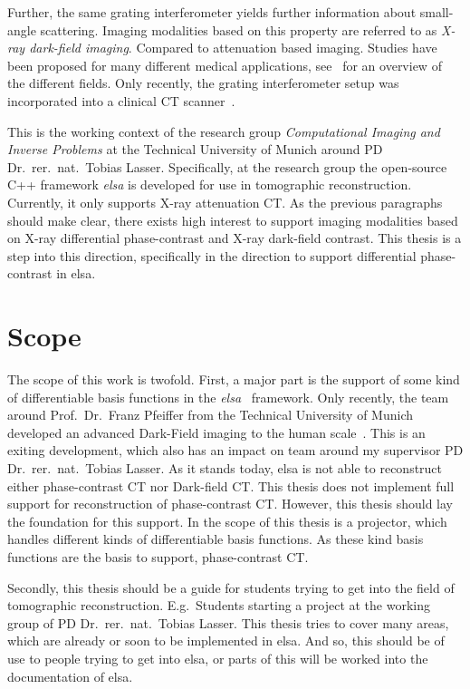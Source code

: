 Further, the same grating interferometer yields further information about small-angle scattering.
Imaging modalities based on this property are referred to as \textit{X-ray dark-field imaging}.
Compared to attenuation based imaging. Studies have been proposed for many different medical
applications, see~\cite[chap. 1.3.1]{wieczorek_anisotropic_2017} for an overview of the different
fields. Only recently, the grating interferometer setup was incorporated into a clinical CT
scanner~\cite{viermetz_dark-field_2022}.

This is the working context of the research group \textit{Computational Imaging and Inverse
	Problems} at the Technical University of Munich around PD Dr.\ rer.\ nat.\ Tobias Lasser.
Specifically, at the research group the open-source C++ framework \textit{elsa} is developed for use
in tomographic reconstruction. Currently, it only supports X-ray attenuation CT\@. As the previous
paragraphs should make clear, there exists high interest to support imaging modalities based on
X-ray differential phase-contrast and X-ray dark-field contrast. This thesis is a step into this
direction, specifically in the direction to support differential phase-contrast in elsa.

\section{Scope}\label{chap:scope}


The scope of this work is twofold. First, a major part is the support of some kind of differentiable
basis functions in the \textit{elsa}~\cite{lasser_elsa_2019} framework. Only recently, the team
around Prof.\ Dr.\ Franz Pfeiffer from the Technical University of Munich developed an advanced
Dark-Field imaging to the human scale~\cite{viermetz_dark-field_2022}. This is an exiting
development, which also has an impact on team around my supervisor PD Dr.\ rer.\ nat.\ Tobias
Lasser. As it stands today, elsa is not able to reconstruct either phase-contrast CT nor Dark-field
CT\@. This thesis does not implement full support for reconstruction of phase-contrast CT\@.
However, this thesis should lay the foundation for this support. In the scope of this thesis is a
projector, which handles different kinds of differentiable basis functions. As these kind basis
functions are the basis to support, phase-contrast CT\@.

Secondly, this thesis should be a guide for students trying to get into the field of tomographic
reconstruction. E.g.\ Students starting a project at the working group of PD Dr.\ rer.\ nat.\ Tobias
Lasser. This thesis tries to cover many areas, which are already or soon to be implemented in elsa.
And so, this should be of use to people trying to get into elsa, or parts of this will be worked
into the documentation of elsa.

